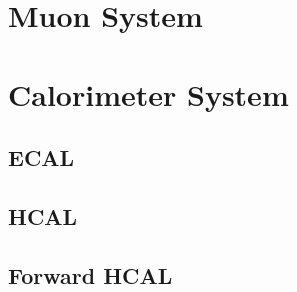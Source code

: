 \section{Muon System}

\section{Calorimeter System}

\subsection{ECAL}

\subsection{HCAL}

\subsection{Forward HCAL}

